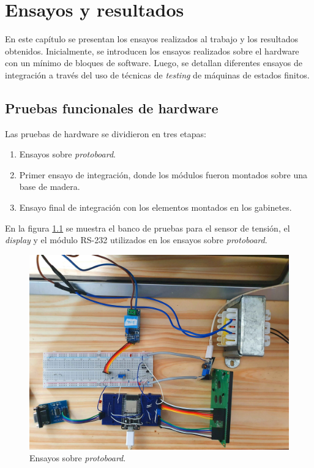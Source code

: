
\chapter{Ensayos y resultados} %

\label{Chapter4} %

En este capítulo se presentan los ensayos realizados al trabajo y los resultados obtenidos. Inicialmente, se introducen los ensayos realizados sobre el hardware con un mínimo de bloques de software. Luego, se detallan diferentes ensayos de integración a través del uso de técnicas de \textit{testing} de máquinas de estados finitos.


\section{Pruebas funcionales de hardware}
\label{sec:pruebasHW}

Las pruebas de hardware se dividieron en tres etapas:

\begin{enumerate}
\item Ensayos sobre \textit{protoboard}. 
\item Primer ensayo de integración, donde los módulos fueron montados sobre una base de madera. 
\item Ensayo final de integración con los elementos montados en los gabinetes.
\end{enumerate}

En la figura \ref{fig:Protoboard} se muestra el banco de pruebas para el sensor de tensión, el \textit{display} y el módulo RS-232 utilizados en los ensayos sobre \textit{protoboard}.

\begin{figure}[htpb]
	\centering
	\includegraphics[scale=0.09]{./Figures/protoboard.jpg}
	\caption{Ensayos sobre \textit{protoboard}.}
	\label{fig:Protoboard}
\end{figure}

